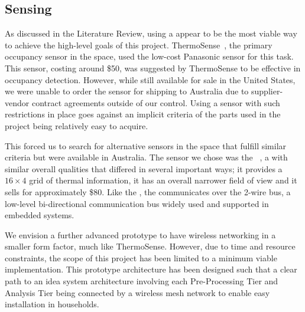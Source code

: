 \documentclass[../thesis/thesis.tex]{subfiles}
\begin{document}
\subsection{Sensing}
As discussed in the Literature Review, using a \iar appear to be the most viable way to achieve the high-level goals of this project. ThermoSense~\cite{beltran2013thermosense}, the primary occupancy sensor in the \iar space, used the low-cost Panasonic \geye sensor for this task. This sensor, costing around \$50, was suggested by ThermoSense to be effective in occupancy detection. However, while still available for sale in the United States, we were unable to order the sensor for shipping to Australia due to supplier-vendor contract agreements outside of our control. Using a sensor with such restrictions in place goes against an implicit criteria of the parts used in the project being relatively easy to acquire.

This forced us to search for alternative sensors in the space that fulfill similar criteria but were available in Australia. The sensor we chose was the \mlx~\cite{MLXDatasheet}, a \iar with similar overall qualities that differed in several important ways; it provides a $16 \times 4$ grid of thermal information, it has an overall narrower field of view and it sells for approximately \$80. Like the \geye, the \mlx communicates over the 2-wire \iic bus, a low-level bi-directional communication bus widely used and supported in embedded systems.

We envision a further advanced prototype to have wireless networking in a smaller form factor, much like ThermoSense. However, due to time and resource constraints, the scope of this project has been limited to a minimum viable implementation. This prototype architecture has been designed such that a clear path to an idea system architecture involving each Pre-Processing Tier and Analysis Tier being connected by a wireless mesh network to enable easy installation in households.
\end{document}
